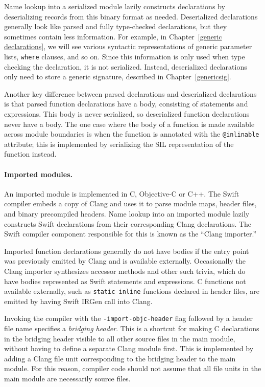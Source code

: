 \documentclass[../generics]{subfiles}
\begin{document}
Name lookup into a serialized module lazily constructs declarations by deserializing records from this binary format as needed. Deserialized declarations generally look like parsed and fully type-checked declarations, but they sometimes contain less information. For example, in Chapter~\ref{generic declarations}, we will see various syntactic representations of generic parameter lists, \texttt{where} clauses, and so on. Since this information is only used when type checking the declaration, it is not serialized. Instead, deserialized declarations only need to store a generic signature, described in Chapter~\ref{genericsig}.

Another key difference between parsed declarations and deserialized declarations is that parsed function declarations have a body, consisting of statements and expressions. This body is never serialized, so deserialized function declarations never have a body. The one case where the body of a function is made available across module boundaries is when the function is annotated with the \texttt{@inlinable} attribute; this is implemented by serializing the SIL representation of the function instead.

\paragraph{Imported modules.} An imported module is implemented in C, Objective-C or C++. The Swift compiler embeds a copy of Clang and uses it to parse module maps, header files, and binary precompiled headers. Name lookup into an imported module lazily constructs Swift declarations from their corresponding Clang declarations. The Swift compiler component responsible for this is known as the ``Clang importer.''

Imported function declarations generally do not have bodies if the entry point was previously emitted by Clang and is available externally. Occasionally the Clang importer synthesizes accessor methods and other such trivia, which do have bodies represented as Swift statements and expressions. C functions not available externally, such as \texttt{static inline} functions declared in header files, are emitted by having Swift IRGen call into Clang.

Invoking the compiler with the \texttt{-import-objc-header} flag followed by a header file name specifies a \emph{bridging header}. This is a shortcut for making C declarations in the bridging header visible to all other source files in the main module, without having to define a separate Clang module first. This is implemented by adding a Clang file unit corresponding to the bridging header to the main module. For this reason, compiler code should not assume that all file units in the main module are necessarily source files.
\end{document}
